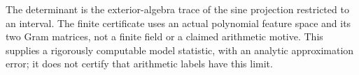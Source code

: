 The determinant is the exterior-algebra trace of the sine projection
restricted to an interval. The finite certificate uses an actual
polynomial feature space and its two Gram matrices, not a finite
field or a claimed arithmetic motive. This supplies a rigorously
computable model statistic, with an analytic approximation error;
it does not certify that arithmetic labels have this limit.
